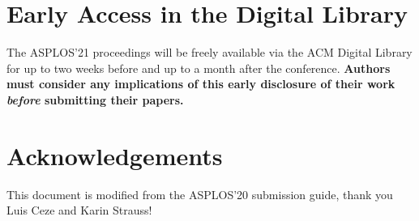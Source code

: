 \documentclass[pageno]{jpaper}
\begin{document}
\section{Early Access in the Digital Library}

The ASPLOS'21 proceedings will be freely available via the ACM Digital
Library for up to two weeks before and up to a month after the
conference. {\bf Authors must consider any implications of this early
disclosure of their work {\em before} submitting their papers.}


\section{Acknowledgements}

This document is modified from the ASPLOS'20 submission guide, thank
you Luis Ceze and Karin Strauss!



\end{document}
